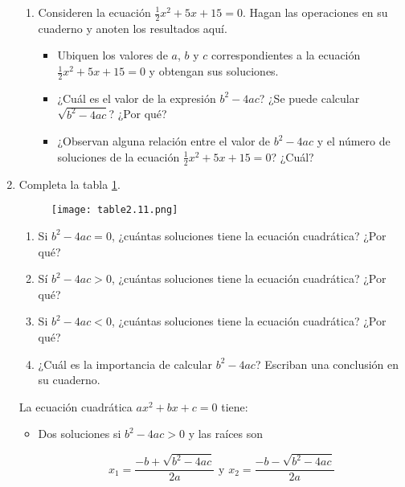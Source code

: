 \begin{enumerate}
\begin{enumerate}
              \item Consideren la ecuación $\frac{1}{2}x^2 + 5x + 15 = 0$. Hagan las operaciones en su cuaderno y anoten los resultados aquí.
                    \begin{itemize}
                        \item Ubiquen los valores de $a$, $b$ y $c$ correspondientes a la ecuación $\frac{1}{2}x^2 + 5x + 15 = 0$ y obtengan sus soluciones.
                        \item ¿Cuál es el valor de la expresión $b^2 - 4ac$? ¿Se puede calcular $\sqrt{b^2 - 4ac}$? ¿Por qué?
                        \item ¿Observan alguna relación entre el valor de $b^2 - 4ac$ y el número de soluciones de la ecuación $\frac{1}{2}x^2 + 5x + 15 = 0$? ¿Cuál?
                    \end{itemize}
          \end{enumerate}

    \item Completa la tabla \ref{tab:table2.11}.

          \begin{figure}[H]
              \centering
              \texttt{[image: table2.11.png]}
              \label{tab:table2.11}
          \end{figure}

          \begin{enumerate}
              \item Si $b^2 - 4ac = 0$, ¿cuántas soluciones tiene la ecuación cuadrática? ¿Por qué?
              \item Sí $b^2 - 4ac > 0$, ¿cuántas soluciones tiene la ecuación cuadrática? ¿Por qué?
              \item Si $b^2 - 4ac < 0$, ¿cuántas soluciones tiene la ecuación cuadrática? ¿Por qué?
              \item ¿Cuál es la importancia de calcular $b^2 - 4ac$? Escriban una conclusión en su cuaderno.
          \end{enumerate}

          \begin{boxH}
              La ecuación cuadrática $ax^2 + bx + c = 0$ tiene:
              \begin{itemize}
                  \item Dos soluciones si $b^2 - 4ac > 0$ y las raíces son

                        \[x_1 = \frac{-b + \sqrt{b^2 - 4ac}}{2a} \text{ y } x_2 = \frac{-b - \sqrt{b^2 - 4ac}}{2a}\]


\end{itemize}
\end{boxH}
\end{enumerate}
